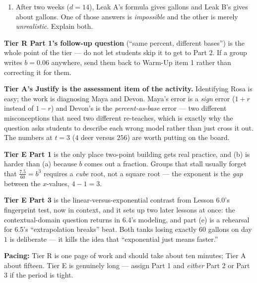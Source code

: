 \documentclass[10pt]{article}
\begin{document}
\begin{tcolorbox}[colback=white, colframe=black!40, title=\textbf{Tier E --- Extension},
    fonttitle=\bfseries, arc=1.5mm, left=3mm, right=3mm, top=2mm, bottom=2mm, breakable]
\begin{enumerate}[label=(\alph*), leftmargin=1.9em, itemsep=6pt]
  \item After two weeks ($d=14$), Leak A's formula gives  gallons and Leak B's
        gives about  gallons. One of those answers is \emph{impossible} and the
        other is merely \emph{unrealistic}. Explain both.
\end{enumerate}
\end{tcolorbox}

\begin{teachernote}
\textbf{Tier R Part 1's follow-up question} (``same percent, different bases'') is the whole point of
the tier --- do not let students skip it to get to Part 2. If a group writes $b=0.06$ anywhere, send
them back to Warm-Up item 1 rather than correcting it for them.

\textbf{Tier A's Justify is the assessment item of the activity.} Identifying Rosa is easy; the
work is diagnosing Maya and Devon. Maya's error is a \emph{sign} error ($1+r$ instead of $1-r$) and
Devon's is the \emph{percent-as-base} error --- two different misconceptions that need two different
re-teaches, which is exactly why the question asks students to describe each wrong model rather than
just cross it out. The numbers at $t=3$ ($4$ deer versus $256$) are worth putting on the board.

\textbf{Tier E Part 1} is the only place two-point building gets real practice, and (b) is harder than
(a) because $b$ comes out a fraction. Groups that stall usually forget that $\frac{7.5}{60}=b^{3}$
requires a \emph{cube} root, not a square root --- the exponent is the \emph{gap} between the
$x$-values, $4-1=3$.

\textbf{Tier E Part 3} is the linear-versus-exponential contrast from Lesson 6.0's fingerprint test,
now in context, and it sets up two later lessons at once: the contextual-domain question returns in
6.4's modeling, and part (e) is a rehearsal for 6.5's ``extrapolation breaks'' beat. Both tanks
losing exactly $60$ gallons on day $1$ is deliberate --- it kills the idea that ``exponential just
means faster.''

\textbf{Pacing:} Tier R is one page of work and should take about ten minutes; Tier A about fifteen.
Tier E is genuinely long --- assign Part 1 and \emph{either} Part 2 or Part 3 if the period is tight.
\end{teachernote}
\end{document}
